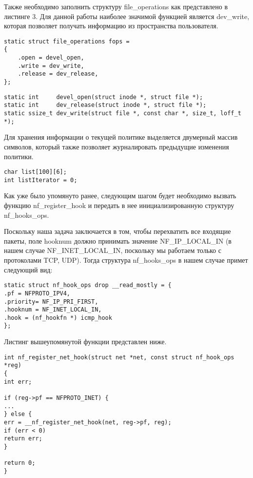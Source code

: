 Также необходимо заполнить структуру file\_operations как представлено в листинге 3. Для данной работы наиболее значимой функцией является dev\_write, которая позволяет получать информацию из пространства пользователя. 
\begin{lstlisting}[caption= struct file\_operations для текущей задачи, label = 1]
static struct file_operations fops =
{
	.open = devel_open,
	.write = dev_write,
	.release = dev_release,
};
\end{lstlisting}

\begin{lstlisting}[caption= функции struct file\_operations, label = 2]
static int     devel_open(struct inode *, struct file *);
static int     dev_release(struct inode *, struct file *);
static ssize_t dev_write(struct file *, const char *, size_t, loff_t *); 
\end{lstlisting}

Для хранения информации о текущей политике выделяется двумерный массив символов, который также позволяет журналировать предыдущие изменения политики.

\begin{lstlisting}[caption=Массив для хранения изменений политики]
char list[100][6];
int listIterator = 0;
\end{lstlisting}

Как уже было упомянуто ранее, следующим шагом будет необходимо вызвать функцию nf\_register\_hook и передать в нее инициализированную структуру nf\_hooks\_ops.

Поскольку наша задача заключается в том, чтобы перехватить все входящие пакеты, поле hooknum должно принимать значение NF\_IP\_LOCAL\_IN (в нашем случае NF\_INET\_LOCAL\_IN, поскольку мы работаем только с протоколами TCP, UDP). Тогда структура nf\_hooks\_ops в нашем случае примет следующий вид:
\begin{lstlisting}[caption= struct nf\_hooks\_ops для текущей задачи]
static struct nf_hook_ops drop __read_mostly = {
.pf = NFPROTO_IPV4,
.priority= NF_IP_PRI_FIRST,
.hooknum = NF_INET_LOCAL_IN,
.hook = (nf_hookfn *) icmp_hook
};
\end{lstlisting}
\newpage
Листинг вышеупомянутой функции представлен ниже.

\begin{lstlisting}[caption= func nf\_register\_hook]
int nf_register_net_hook(struct net *net, const struct nf_hook_ops *reg)
{
int err;

if (reg->pf == NFPROTO_INET) {
...
} else {
err = __nf_register_net_hook(net, reg->pf, reg);
if (err < 0)
return err;
}

return 0;
}
\end{lstlisting}

